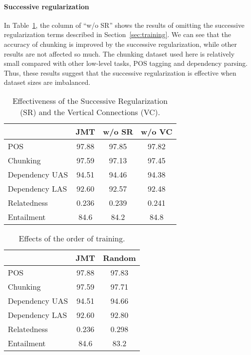 \documentclass[11pt,a4paper]{article}
\begin{document}
\paragraph{Successive regularization}
In Table~\ref{tb:successive_reg}, the column of ``w/o SR'' shows the results of omitting the successive regularization terms described in Section~\ref{sec:training}.
We can see that the accuracy of chunking is improved by the successive regularization, while other results are not affected so much.
The chunking dataset used here is relatively small compared with other low-level tasks, POS tagging and dependency parsing.
Thus, these results suggest that the successive regularization is effective when dataset sizes are imbalanced.


\begin{table}[t]
{\scriptsize
	\begin{center}
	\begin{tabular}{l|c|c|c}
  			   & JMT & w/o SR & w/o VC \\ \hline
    POS        & 97.88 & 97.85		& 97.82 \\ \hline
    Chunking   & 97.59 & 97.13		& 97.45 \\ \hline
    Dependency UAS & 94.51 & 94.46 	& 94.38 \\
    Dependency LAS & 92.60 & 92.57 	& 92.48 \\ \hline
    Relatedness    & 0.236 & 0.239 	& 0.241 \\ \hline
    Entailment     & 84.6  & 84.2	& 84.8  \\ \hline
  \end{tabular}
  \end{center}
}
    \caption{Effectiveness of the Successive Regularization (SR) and the Vertical Connections (VC).}
    \label{tb:successive_reg}
\end{table}

\begin{table}[t]
{\scriptsize
	\begin{center}
	\begin{tabular}{l|c|c}
  			   & JMT & Random \\ \hline
    POS        & 97.88 & 97.83	\\ \hline
    Chunking   & 97.59 & 97.71	\\ \hline
    Dependency UAS & 94.51 & 94.66 \\
    Dependency LAS & 92.60 & 92.80 	\\ \hline
    Relatedness    & 0.236 & 0.298 	\\ \hline
    Entailment     & 84.6  & 83.2	\\ \hline
  \end{tabular}
  \end{center}
}
    \caption{Effects of the order of training.}
    \label{tb:random}
\end{table}
\end{document}
